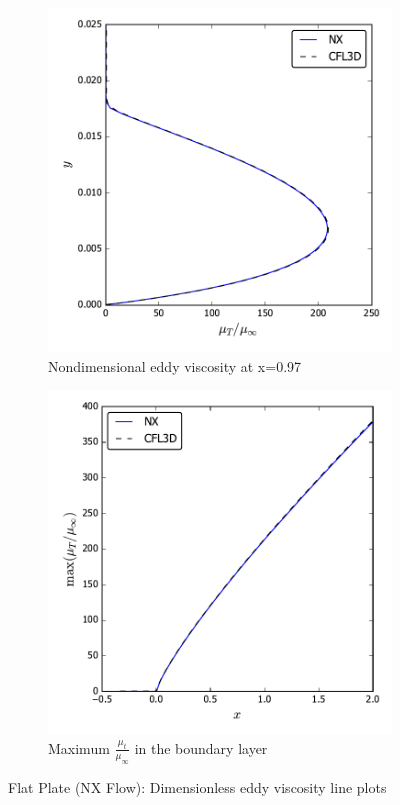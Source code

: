 \begin{figure}[ht!]
\centering
\begin{subfigure}{.45\textwidth}
  \centering
  \includegraphics[width=1.0\textwidth]{figs/flatnx/mut.pdf}
  \caption{Nondimensional eddy viscosity at x=0.97 }
\end{subfigure}%
\begin{subfigure}{.45\textwidth}
  \centering
  \includegraphics[width=1.0\textwidth]{figs/flatnx/maxmut.pdf}
  \caption{Maximum $\frac{\mu_t}{\mu_{\infty}}$ in the boundary layer}
  \label{fig:nxflatmutmax}
\end{subfigure}
\caption{Flat Plate (NX Flow): Dimensionless eddy viscosity line plots}
\label{fig:nxflatmu}
\end{figure}

